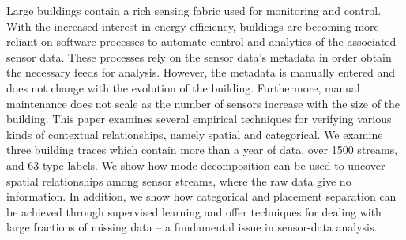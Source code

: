 

Large buildings contain a rich sensing fabric used for monitoring and control.
With the increased interest in energy efficiency, buildings are becoming more reliant on software processes
to automate control and analytics of the associated sensor data.  These processes rely on the sensor data's
metadata in order obtain the necessary feeds for analysis.  However, the metadata is manually entered and 
does not change with the evolution of the building.  Furthermore, manual maintenance does not scale as the number
of sensors increase with the size of the building.  %
This paper examines several empirical techniques for verifying various
kinds of contextual relationships, namely spatial and categorical.  We examine three building traces which contain
more than a year of data, over 1500 streams, and 63 type-labels.
We show how mode decomposition
can be used to uncover spatial relationships among sensor streams, where the raw data give no information.
In addition, we show how categorical and placement  
separation can be achieved through supervised learning and offer techniques for dealing with 
large fractions of missing data -- a fundamental issue in sensor-data analysis.

